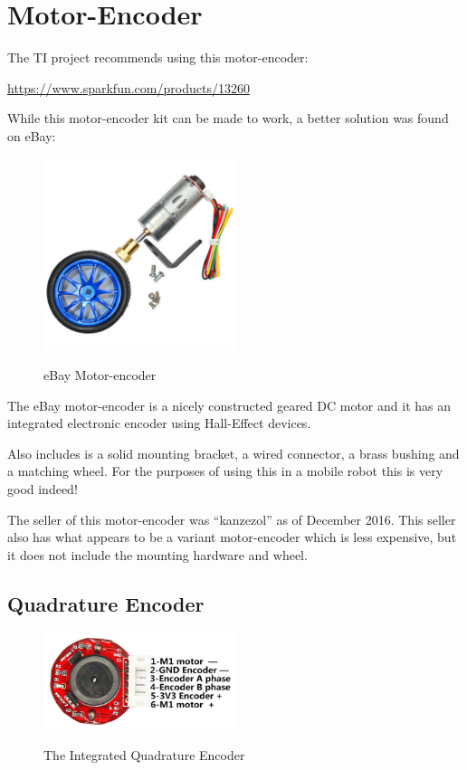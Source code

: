 \chapter{Motor-Encoder}

The TI project recommends using this motor-encoder:

\url{https://www.sparkfun.com/products/13260}

While this motor-encoder kit can be made to work, a better solution was found on eBay:

\begin{figure}[h]
	\centering
    \includegraphics[width=0.5\textwidth]{photos/s-l500.jpg}
	\centering\bfseries
	\caption{eBay Motor-encoder}
\end{figure}

The eBay motor-encoder is a nicely constructed geared DC motor and it has an integrated electronic encoder using Hall-Effect devices.

Also includes is a solid mounting bracket, a wired connector, a brass bushing and a matching wheel.  For the purposes of using this in a mobile robot this is very good indeed!

The seller of this motor-encoder was ``kanzezol'' as of December 2016.  This seller also has what appears to be a variant motor-encoder which is less expensive, but it does not include the mounting hardware and wheel.

\section{Quadrature Encoder}

\begin{figure}[h]
	\centering
    \includegraphics[width=0.5\textwidth]{photos/encoder-close-view.jpg}
	\centering\bfseries
	\caption{The Integrated Quadrature Encoder}
\end{figure}

